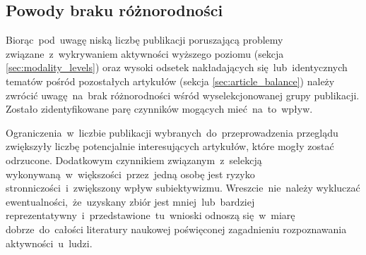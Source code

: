 \subsection{Powody braku różnorodności}
Biorąc~pod~uwagę niską liczbę publikacji poruszającą problemy związane~z~wykrywaniem aktywności wyższego poziomu (sekcja \ref{sec:modality_levels}) oraz wysoki odsetek nakładających się~lub~identycznych tematów pośród pozostałych artykułów (sekcja \ref{sec:article_balance}) należy zwrócić uwagę~na~brak różnorodności wśród wyselekcjonowanej grupy publikacji. Zostało zidentyfikowane parę czynników mogących mieć~na~to~wpływ. 

Ograniczenia~w~liczbie publikacji wybranych~do~przeprowadzenia przeglądu zwiększyły liczbę potencjalnie interesujących artykułów, które mogły zostać odrzucone. Dodatkowym czynnikiem związanym~z~selekcją wykonywaną~w~większości~przez~jedną osobę jest ryzyko stronniczości~i~zwiększony wpływ subiektywizmu. Wreszcie~nie~należy wykluczać ewentualności,~że~uzyskany zbiór jest mniej~lub~bardziej reprezentatywny~i~przedstawione~tu~wnioski odnoszą się~w~miarę dobrze~do~całości literatury naukowej poświęconej zagadnieniu rozpoznawania aktywności~u~ludzi.
